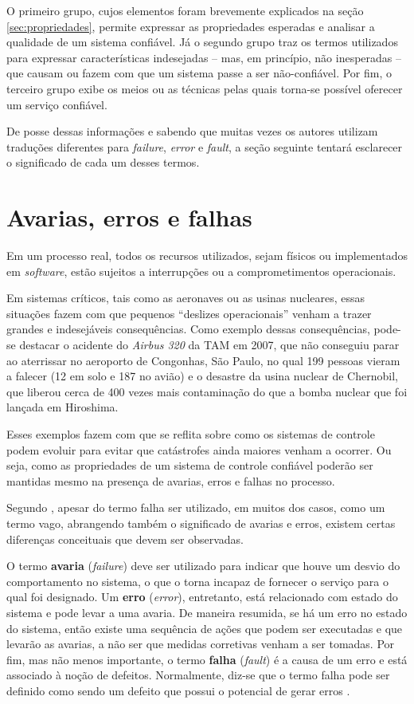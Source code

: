 O primeiro grupo, cujos elementos foram brevemente explicados na seção
\ref{sec:propriedades}, permite expressar as propriedades esperadas e analisar a
qualidade de um sistema confiável. Já o segundo grupo traz os termos utilizados
para expressar características indesejadas -- mas, em princípio, não inesperadas
-- que causam ou fazem com que um sistema passe a ser não-confiável. Por fim, o
terceiro grupo exibe os meios ou as técnicas pelas quais torna-se possível
oferecer um serviço confiável.

De posse dessas informações e sabendo que muitas vezes os autores utilizam
traduções diferentes para {\it failure}, {\it error} e {\it fault}, a seção
seguinte tentará esclarecer o significado de cada um desses termos.

\section{Avarias, erros e falhas}\label{sec:avaria_erro_falha}
Em um processo real, todos os recursos utilizados, sejam físicos ou
implementados em {\it software}, estão sujeitos a interrupções ou a
comprometimentos operacionais.

Em sistemas críticos, tais como as aeronaves ou as usinas nucleares, essas
situações fazem com que pequenos ``deslizes operacionais'' venham a trazer
grandes e indesejáveis consequências. Como exemplo dessas consequências, pode-se
destacar o acidente do {\it Airbus 320} da TAM em 2007, que não conseguiu parar
ao aterrissar no aeroporto de Congonhas, São Paulo, no qual 199 pessoas vieram a
falecer (12 em solo e 187 no avião) e o desastre da usina nuclear de Chernobil,
que liberou cerca de 400 vezes mais contaminação do que a bomba nuclear que foi
lançada em Hiroshima.

Esses exemplos fazem com que se reflita sobre como os sistemas de controle podem
evoluir para evitar que catástrofes ainda maiores venham a ocorrer. Ou seja,
como as propriedades de um sistema de controle confiável poderão ser mantidas
mesmo na presença de avarias, erros e falhas no processo.

Segundo , apesar do termo falha ser utilizado, em muitos
dos casos, como um termo vago, abrangendo também o significado de avarias e
erros, existem certas diferenças conceituais que devem ser observadas.

O termo {\bf avaria} ({\it failure}) deve ser utilizado para indicar que houve
um desvio do comportamento no sistema, o que o torna incapaz de fornecer o
serviço para o qual foi designado. Um {\bf erro} ({\it error}), entretanto, está
relacionado com estado do sistema e pode levar a uma avaria. De maneira
resumida, se há um erro no estado do sistema, então existe uma sequência de
ações que podem ser executadas e que levarão as avarias, a não ser que medidas
corretivas venham a ser tomadas. Por fim, mas não menos importante, o termo {\bf
falha} ({\it fault}) é a causa de um erro e está associado à noção de defeitos.
Normalmente, diz-se que o termo falha pode ser definido como sendo um defeito
que possui o potencial de gerar erros \cite{nelio:2002,weber:2002}.

